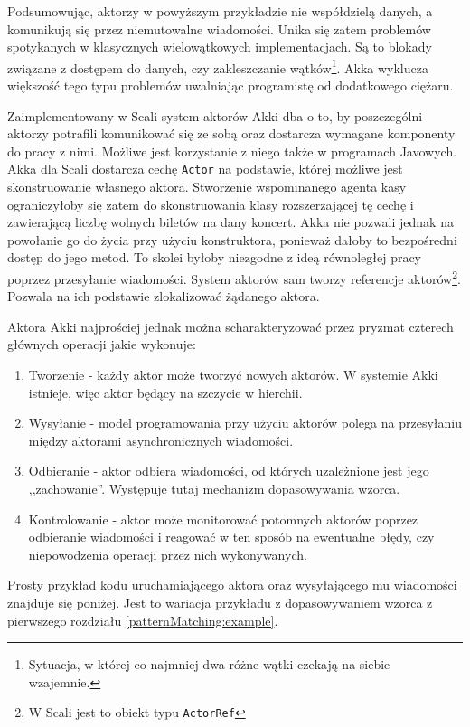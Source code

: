 \documentclass[brudnopis]{xmgr}
\begin{document}
Podsumowując, aktorzy w powyższym przykładzie nie współdzielą danych, a komunikują się przez niemutowalne wiadomości. Unika się zatem problemów spotykanych w klasycznych wielowątkowych implementacjach. Są to blokady związane z dostępem do danych, czy zakleszczanie wątków\footnote{Sytuacja, w której co najmniej dwa różne wątki czekają na siebie wzajemnie.}. Akka wyklucza większość tego typu problemów uwalniając programistę od dodatkowego ciężaru.

Zaimplementowany w Scali system aktorów Akki dba o to, by poszczególni aktorzy potrafili komunikować się ze sobą oraz dostarcza wymagane komponenty do pracy z nimi. Możliwe jest korzystanie z niego także w programach Javowych. Akka dla Scali dostarcza cechę \texttt{Actor} na podstawie, której możliwe jest skonstruowanie własnego aktora. Stworzenie wspominanego agenta kasy ograniczyłoby się zatem do skonstruowania klasy rozszerzającej tę cechę i zawierającą liczbę wolnych biletów na dany koncert. Akka nie pozwali jednak na powołanie go do życia przy użyciu konstruktora, ponieważ dałoby to bezpośredni dostęp do jego metod. To skolei byłoby niezgodne z ideą równoległej pracy poprzez przesyłanie wiadomości. System aktorów sam tworzy referencje aktorów\footnote{W Scali jest to obiekt typu \texttt{ActorRef}}. Pozwala na ich podstawie zlokalizować żądanego aktora.

Aktora Akki najprościej jednak można scharakteryzować przez pryzmat czterech głównych operacji jakie wykonuje:

\begin{enumerate}
\item Tworzenie - każdy aktor może tworzyć nowych aktorów. W systemie Akki istnieje, więc aktor będący na szczycie w hierchii.
\item Wysyłanie - model programowania przy użyciu aktorów polega na przesyłaniu między aktorami asynchronicznych wiadomości. 
\item Odbieranie - aktor odbiera wiadomości, od których uzależnione jest jego ,,zachowanie''. Występuje tutaj mechanizm dopasowywania wzorca.
\item Kontrolowanie - aktor może monitorować potomnych aktorów poprzez odbieranie wiadomości i reagować w ten sposób na ewentualne błędy, czy niepowodzenia operacji przez nich wykonywanych.
\end{enumerate}

Prosty przykład kodu uruchamiającego aktora oraz wysyłającego mu wiadomości znajduje się poniżej. Jest to wariacja przykładu z dopasowywaniem wzorca z pierwszego rozdziału \ref{patternMatching:example}.
\end{document}
